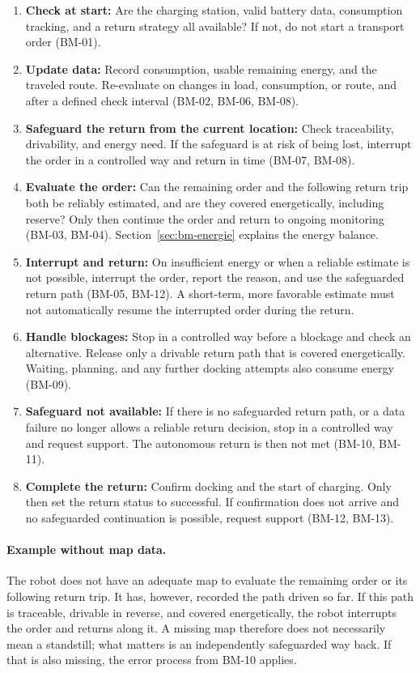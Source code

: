 \begin{enumerate}
    \item \textbf{Check at start:} Are the charging station, valid battery data, consumption tracking, and a return strategy all available? If not, do not start a transport order (BM-01).
    \item \textbf{Update data:} Record consumption, usable remaining energy, and the traveled route. Re-evaluate on changes in load, consumption, or route, and after a defined check interval (BM-02, BM-06, BM-08).
    \item \textbf{Safeguard the return from the current location:} Check traceability, drivability, and energy need. If the safeguard is at risk of being lost, interrupt the order in a controlled way and return in time (BM-07, BM-08).
    \item \textbf{Evaluate the order:} Can the remaining order and the following return trip both be reliably estimated, and are they covered energetically, including reserve? Only then continue the order and return to ongoing monitoring (BM-03, BM-04). Section~\ref{sec:bm-energie} explains the energy balance.
    \item \textbf{Interrupt and return:} On insufficient energy or when a reliable estimate is not possible, interrupt the order, report the reason, and use the safeguarded return path (BM-05, BM-12). A short-term, more favorable estimate must not automatically resume the interrupted order during the return.
    \item \textbf{Handle blockages:} Stop in a controlled way before a blockage and check an alternative. Release only a drivable return path that is covered energetically. Waiting, planning, and any further docking attempts also consume energy (BM-09).
    \item \textbf{Safeguard not available:} If there is no safeguarded return path, or a data failure no longer allows a reliable return decision, stop in a controlled way and request support. The autonomous return is then not met (BM-10, BM-11).
    \item \textbf{Complete the return:} Confirm docking and the start of charging. Only then set the return status to successful. If confirmation does not arrive and no safeguarded continuation is possible, request support (BM-12, BM-13).
\end{enumerate}

\paragraph{Example without map data.}
The robot does not have an adequate map to evaluate the remaining order or its following return trip. It has, however, recorded the path driven so far. If this path is traceable, drivable in reverse, and covered energetically, the robot interrupts the order and returns along it. A missing map therefore does not necessarily mean a standstill; what matters is an independently safeguarded way back. If that is also missing, the error process from BM-10 applies.

